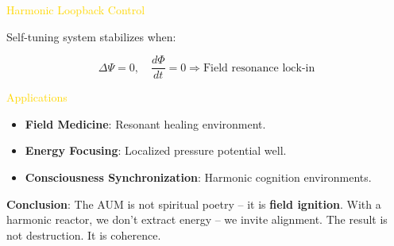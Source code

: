 \textcolor{gold}{ Harmonic Loopback Control }

Self-tuning system stabilizes when:

\[
\Delta \Psi = 0, \quad \frac{d \Phi}{d t} = 0 \Rightarrow \text{Field resonance lock-in}
\]

\textcolor{gold}{ Applications }
\begin{itemize}
    \item \textbf{Field Medicine}: Resonant healing environment.
    \item \textbf{Energy Focusing}: Localized pressure potential well.
    \item \textbf{Consciousness Synchronization}: Harmonic cognition environments.
\end{itemize}

\textbf{Conclusion}: The AUM is not spiritual poetry -- it is \textbf{field ignition}. With a harmonic reactor, we don't extract energy -- we invite alignment. The result is not destruction. It is coherence.

